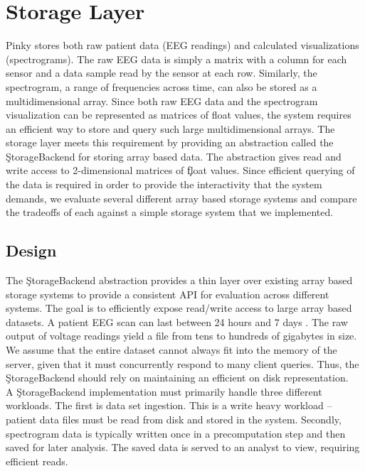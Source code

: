 \chapter{Storage Layer}\label{storage-ch}

Pinky stores both raw patient data (EEG readings) and calculated visualizations
(spectrograms). The raw EEG data is simply a matrix with a column for each
sensor and a data sample read by the sensor at each row. Similarly, the
spectrogram, a range of frequencies across time, can also be stored as a
multidimensional array. Since both raw EEG data and the spectrogram
visualization can be represented as matrices of float values, the system
requires an efficient way to store and query such large multidimensional
arrays.  The storage layer meets this requirement by providing an abstraction
called the \c{StorageBackend} for storing array based data. The abstraction
gives read and write access to 2-dimensional matrices of \c{float} values.
Since efficient querying of the data is required in order to provide the
interactivity that the system demands, we evaluate several different array
based storage systems and compare the tradeoffs of each against a simple
storage system that we implemented.


\section{Design}

The \c{StorageBackend} abstraction provides a thin layer over existing array
based storage systems to provide a consistent API for evaluation across
different systems. The goal is to efficiently expose read/write access to large
array based datasets. A patient EEG scan can last between 24 hours and 7 days
\cite{ceeg-3}. The raw output of voltage readings yield a file from tens to
hundreds of gigabytes in size. We assume that the entire dataset cannot always
fit into the memory of the server, given that it must concurrently respond to
many client queries. Thus, the \c{StorageBackend} should rely on maintaining an
efficient on disk representation. \\

A \c{StorageBackend} implementation must primarily handle three different
workloads. The first is data set ingestion. This is a write heavy workload --
patient data files must be read from disk and stored in the system. Secondly,
spectrogram data is typically written once in a precomputation step and then
saved for later analysis. The saved data is served to an analyst to view,
requiring efficient reads.

